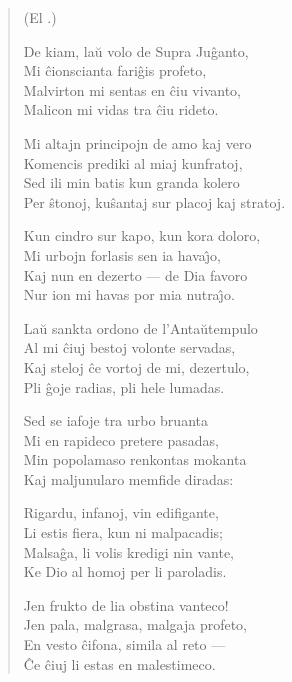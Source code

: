 \begin{verse}
\begin{center}
\footnotesize (El .)
\end{center}

                     De kiam, la\u u volo de Supra Ju\^ganto,\\
                     Mi \^cionscianta fari\^gis profeto,\\
                     Malvirton mi sentas en \^ciu vivanto,\\
                     Malicon mi vidas tra \^ciu rideto.

                     Mi altajn principojn de amo kaj vero\\
                     Komencis prediki al miaj kunfratoj,\\
                     Sed ili min batis kun granda kolero\\
                     Per \^stonoj, ku\^santaj sur placoj kaj stratoj.

                     Kun cindro sur kapo, kun kora doloro,\\
                     Mi urbojn forlasis sen ia hava\^{\j}o,\\
                     Kaj nun en dezerto --- de Dia favoro\\
                     Nur ion mi havas por mia nutra\^{\j}o.

                     La\u u sankta ordono de l'Anta\u utempulo\\
                     Al mi \^ciuj bestoj volonte servadas,\\
                     Kaj steloj \^ce vortoj de mi, dezertulo,\\
                     Pli \^goje radias, pli hele lumadas.

                     Sed se iafoje tra urbo bruanta\\
                     Mi en rapideco pretere pasadas,\\
                     Min popolamaso renkontas mokanta\\
                     Kaj maljunularo memfide diradas:

                     Rigardu, infanoj, vin edifigante,\\
                     Li estis fiera, kun ni malpacadis;\\
                     Malsa\^ga, li volis kredigi nin vante,\\
                     Ke Dio al homoj per li paroladis.

                     Jen frukto de lia obstina vanteco!\\
                     Jen pala, malgrasa, malgaja profeto,\\
                     En vesto \^cifona, simila al reto ---\\
                     \^Ce \^ciuj li estas en malestimeco.

\end{verse}

\smallrule{}
